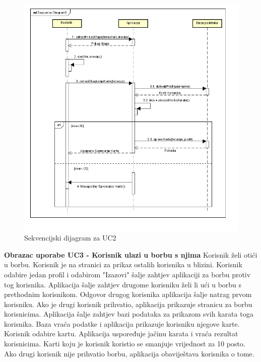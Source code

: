 		\begin{figure}[H]
			\includegraphics[width=\textwidth]{slike/SeqUC2.png} %
			\caption{Sekvencijski dijagram za UC2}
			\label{fig:promjene3} %
		\end{figure}
\pagebreak

\noindent \textbf{Obrazac uporabe UC3 - Korisnik ulazi u borbu s njima}
    Korisnik želi otići u borbu. Korisnik je na stranici za prikaz ostalih korisnika u blizini. Korisnik odabire jedan profil i odabirom "Izazovi" šalje zahtjev aplikaciji za borbu protiv tog korisnika. Aplikacija šalje zahtjev drugome korisniku želi li ući u borbu s prethodnim korisnikom. Odgovor drugog korisnika aplikacija šalje natrag prvom korisniku. Ako je drugi korisnik prihvatio, aplikacija prikazuje stranicu za borbu korisnicima. Aplikacija šalje zahtjev bazi podataka za prikazom svih karata toga korisnika. Baza vraća podatke i aplikacija prikazuje korisniku njegove karte. Korisnik odabire kartu. Aplikacija uspoređuje jačinu karata i vraća rezultat korisnicima. Karti koju je korisnik koristio se smanjuje vrijednost za 10 posto. Ako drugi korisnik nije prihvatio borbu, aplikacija obaviještava korisnika o tome.
    

